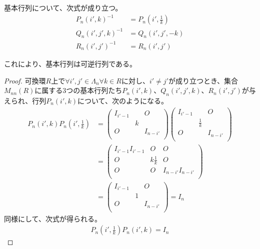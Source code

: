 \documentclass[dvipdfmx]{jsarticle}
\begin{document}
\begin{thm}\label{2.1.7.1}
基本行列について、次式が成り立つ。
\begin{align*}
{P_{n}\left( i',k \right)}^{- 1} &= P_{n}\left( i',\frac{1}{k} \right)\\
{Q_{n}\left( i',j',k \right)}^{- 1} &= Q_{n}\left( i',j', - k \right)\\
{R_{n}\left( i',j' \right)}^{- 1} &= R_{n}\left( i',j' \right)
\end{align*}
\end{thm}\par
これにより、基本行列は可逆行列である。
\begin{proof}
可換環$R$上で$\forall i',j' \in \varLambda_{n}\forall k \in R$に対し、$i' \neq j'$が成り立つとき、集合$M_{nn}(R)$に属する3つの基本行列たち$P_{n}\left( i',k \right)$、$Q_{n}\left( i',j',k \right)$、$R_{n}\left( i',j' \right)$が与えられ、行列$P_{n}\left( i',k \right)$について、次のようになる。
\begin{align*}
P_{n}\left( i',k \right)P_{n}\left( i',\frac{1}{k} \right) &= \begin{pmatrix}
I_{i' - 1} & \  & O \\
\  & k & \  \\
O & \  & I_{n - i'} \\
\end{pmatrix}\begin{pmatrix}
I_{i' - 1} & \  & O \\
\  & \frac{1}{k} & \  \\
O & \  & I_{n - i'} \\
\end{pmatrix}\\
&= \begin{pmatrix}
I_{i' - 1}I_{i' - 1} & O & O \\
O & k\frac{1}{k} & O \\
O & O & I_{n - i'}I_{n - i'} \\
\end{pmatrix}\\
&= \begin{pmatrix}
I_{i' - 1} & \  & O \\
\  & 1 & \  \\
O & \  & I_{n - i'} \\
\end{pmatrix} = I_{n}
\end{align*}
同様にして、次式が得られる。
\begin{align*}
P_{n}\left( i',\frac{1}{k} \right)P_{n}\left( i',k \right) = I_{n}
\end{align*}

\end{proof}
\end{document}
